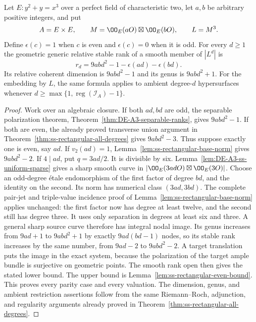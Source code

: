 \begin{theorem}
\label{thm:DE-A3-all-ss-rectangles}
Let $E:y^2+y=x^3$ over a perfect field of characteristic two, let
$a,b$ be arbitrary positive integers, and put
\[
 A=E\times E,\qquad M=\OO_E(aO)\boxtimes\OO_E(bO),\qquad L=M^3.
\]
Define $\epsilon(c)=1$ when $c$ is even and $\epsilon(c)=0$ when it
is odd.  For every $d\ge1$ the geometric generic relative stable rank
of a smooth member of $|L^d|$ is
\[
                  r_d=9abd^2-1-\epsilon(ad)-\epsilon(bd).
\]
Its relative coherent dimension is $9abd^2-1$ and its genus is
$9abd^2+1$.  For the embedding by $L$, the same formula applies to
ambient degree-$d$ hypersurfaces whenever
$d\ge\max\{1,\operatorname{reg}(\mathcal I_A)-1\}$.
\end{theorem}
\begin{proof}
Work over an algebraic closure.  If both $ad,bd$ are odd, the separable
polarization theorem, Theorem~\ref{thm:DE-A3-separable-ranks}, gives
$9abd^2-1$.  If both are even, the already proved transverse union
argument in Theorem~\ref{thm:ss-rectangular-all-degrees} gives
$9abd^2-3$.  Thus suppose exactly one is even, say $ad$.
If $v_2(ad)=1$, Lemma~\ref{lem:ss-rectangular-base-norm} gives
$9abd^2-2$.
If $4\mid ad$, put $q=3ad/2$.  It is divisible by six.
Lemma~\ref{lem:DE-A3-ss-uniform-sparse} gives a sharp smooth curve
in $|\OO_E(3adO)\boxtimes\OO_E(3O)|$.
Choose an odd-degree \'etale endomorphism of the first factor of degree
$bd$, and the identity on the second.  Its norm has numerical class
$(3ad,3bd)$.  The complete pair-jet and triple-value incidence proof
of Lemma~\ref{lem:ss-rectangular-base-norm} applies unchanged: the first
factor now has degree at least twelve, and the second still has degree
three.  It uses only separation in degrees at least six and three.
A general sharp source curve therefore has integral nodal image.
Its genus increases from $9ad+1$ to $9abd^2+1$ by exactly
$9ad(bd-1)$ nodes, so its stable rank increases by the same number,
from $9ad-2$ to $9abd^2-2$.
A target translation puts the image in the exact system, because the
polarization of the target ample bundle is surjective on geometric
points.  The smooth rank open then gives the stated lower bound.
The upper bound is Lemma~\ref{lem:ss-rectangular-even-bound}.
This proves every parity case and every valuation.
The dimension, genus, and ambient restriction assertions follow from
the same Riemann--Roch, adjunction, and regularity arguments already
proved in Theorem~\ref{thm:ss-rectangular-all-degrees}.
\end{proof}

